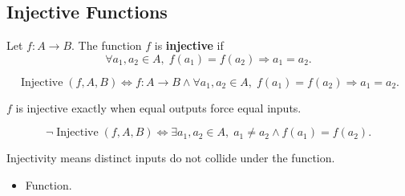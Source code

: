 \subsection{Injective Functions}
\label{subsec:injective-functions}

\begin{tcolorbox}[title={Definition --- Injective}]
\begin{definition}
\label{def:alg-injective}
Let $f:A\to B$.
The function $f$ is \textbf{injective} if
\[
\forall a_1,a_2 \in A,\;
f(a_1)=f(a_2) \Rightarrow a_1=a_2.
\]
\end{definition}
\end{tcolorbox}

\begin{remark*}
\[
\operatorname{Injective}(f,A,B)
\Longleftrightarrow
f:A\to B
\land
\forall a_1,a_2\in A,\; f(a_1)=f(a_2)\Rightarrow a_1=a_2.
\]
\end{remark*}

\begin{remark*}
$f$ is injective exactly when equal outputs force equal inputs.
\end{remark*}

\begin{remark*}
\[
\neg\operatorname{Injective}(f,A,B)
\Longleftrightarrow
\exists a_1,a_2\in A,\;
a_1\neq a_2 \land f(a_1)=f(a_2).
\]
\end{remark*}

\begin{remark*}[Interpretation]
Injectivity means distinct inputs do not collide under the function.
\end{remark*}

\begin{remark*}[Dependencies]
\begin{itemize}
  \item Function.
\end{itemize}
\end{remark*}
